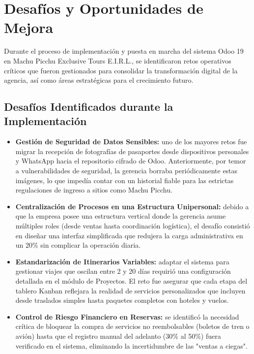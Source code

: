 \section{Desafíos y Oportunidades de Mejora}

Durante el proceso de implementación y puesta en marcha del sistema Odoo 19 en Machu Picchu
Exclusive Tours E.I.R.L., se identificaron retos operativos críticos que fueron gestionados
para consolidar la transformación digital de la agencia, así como áreas estratégicas para el
crecimiento futuro.

\subsection{Desafíos Identificados durante la Implementación}
\begin{itemize}
    \item \textbf{Gestión de Seguridad de Datos Sensibles:} uno de los mayores retos fue migrar la recepción de fotografías de pasaportes desde dispositivos personales y WhatsApp hacia el repositorio cifrado de Odoo. Anteriormente, por temor a vulnerabilidades de seguridad, la gerencia borraba periódicamente estas imágenes, lo que impedía contar con un historial fiable para las estrictas regulaciones de ingreso a sitios como Machu Picchu.
    \item \textbf{Centralización de Procesos en una Estructura Unipersonal:} debido a que la empresa posee una estructura vertical donde la gerencia asume múltiples roles (desde ventas hasta coordinación logística), el desafío consistió en diseñar una interfaz simplificada que redujera la carga administrativa en un 20\% sin complicar la operación diaria.
    \item \textbf{Estandarización de Itinerarios Variables:} adaptar el sistema para gestionar viajes que oscilan entre 2 y 20 días requirió una configuración detallada en el módulo de Proyectos. El reto fue asegurar que cada etapa del tablero Kanban reflejara la realidad de servicios personalizados que incluyen desde traslados simples hasta paquetes completos con hoteles y vuelos.
    \item \textbf{Control de Riesgo Financiero en Reservas:} se identificó la necesidad crítica de bloquear la compra de servicios no reembolsables (boletos de tren o avión) hasta que el registro manual del adelanto (30\% al 50\%) fuera verificado en el sistema, eliminando la incertidumbre de las "ventas a ciegas".
\end{itemize}

